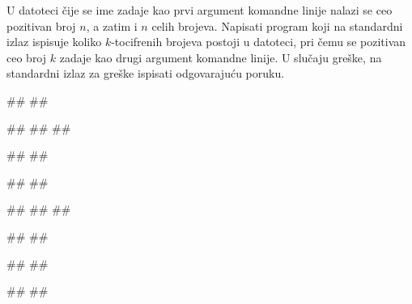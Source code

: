 




\begin{Exercise}[label=v3_03] 
U datoteci čije se ime zadaje kao prvi argument komandne linije
nalazi se ceo pozitivan broj $n$, a zatim i $n$ celih brojeva. Napisati program koji
na standardni izlaz ispisuje 
koliko $k$-tocifrenih brojeva postoji u datoteci, pri čemu se
pozitivan ceo broj $k$ zadaje kao drugi argument komandne linije.
U slučaju greške, na standardni izlaz za greške ispisati odgovarajuću poruku.

\begin{minitest}
\begin{upotreba}{1}
#\naslovPokretanje#
##

##
##
##

#\naslovIzlaz#
##
\end{upotreba}
\end{minitest}
\begin{minitest}
\begin{upotreba}{2}
#\naslovPokretanje#
##

##
##
##

#\naslovIzlaz#
##
\end{upotreba}
\end{minitest}
\begin{minitest}
\begin{upotreba}{3}
#\naslovPokretanje#
##

#\naslovIzlazZaGresku#
##
\end{upotreba}
\end{minitest}
\end{Exercise}
\begin{Answer}[ref=v3_03]
\end{Answer}


